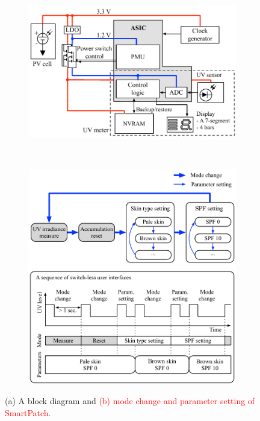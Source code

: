 \documentclass[journal]{IEEEtran}
\begin{document}
%

\begin{figure}
\centering
	\begin{subfigure}{0.45\textwidth}
	\includegraphics[width=1.0\hsize]{Figures/block_diagram.pdf}
	\caption{}
	\label{fig:block_diagram}
	\end{subfigure}
~
	\begin{subfigure}{0.45\textwidth}
	\includegraphics[width=1.0\hsize]{Figures/configuration.pdf}
	\caption{}
	\label{fig:configuration}
	\end{subfigure}
\caption{(a) A block diagram and \textcolor{red}{(b) mode change and parameter setting of SmartPatch.}}
\end{figure}
\end{document}

